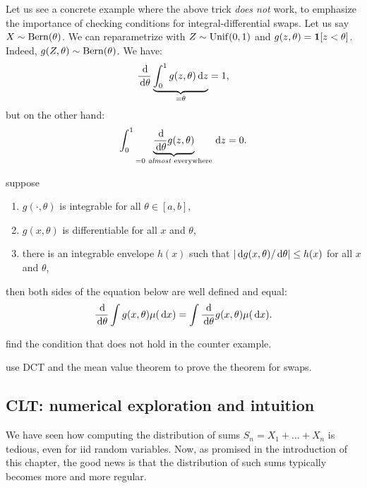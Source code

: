 \documentclass{article}
\begin{document}
 Let us see a concrete example where the above trick \emph{does not} work, to emphasize the importance of checking conditions for integral-differential swaps. Let us say $X \sim \operatorname{Bern}(\theta)$. We can reparametrize with $Z \sim \operatorname{Unif}(0,1)$ and $g(z, \theta) = {\mathbf 1}[z < \theta]$. Indeed, $g(Z, \theta) \sim \operatorname{Bern}(\theta)$. We have:
\[  \frac{\,\mathrm{d}}{\,\mathrm{d} \theta} \underbrace{ \int_0^1 g(z, \theta) \,\mathrm{d} z }_{=\theta} = 1,  \]
but on the other hand:
\[  \int_0^1 \underbrace{\frac{\,\mathrm{d}}{\,\mathrm{d} \theta} g(z, \theta)}_{=0 \text{ \emph{almost} everywhere}} \,\mathrm{d} z = 0. \]

 suppose 
\begin{enumerate}
  \item $g(\cdot, \theta)$ is integrable for all $\theta \in [a, b]$, 
  \item $g(x, \theta)$ is differentiable for all $x$ and $\theta$, 
  \item there is an integrable envelope $h(x)$ such that $|\,\mathrm{d} g(x, \theta) / \,\mathrm{d} \theta| \le h(x)$ for all $x$ and $\theta$,
\end{enumerate}
then both sides of the equation below are well defined and equal:
\[ \frac{\,\mathrm{d}}{\,\mathrm{d} \theta} \int g(x, \theta) \mu(\,\mathrm{d} x) = \int \frac{\,\mathrm{d}}{\,\mathrm{d} \theta} g(x, \theta)   \mu(\,\mathrm{d} x). \]

 find the condition that does not hold in the counter example.

 use DCT and the mean value theorem to prove the theorem for swaps.


\subsection{CLT: numerical exploration and intuition}\label{sec:clt-numerical}

We have seen how computing the distribution of sums $S_n = X_1 + \dots + X_n$ is tedious, even for iid random variables. Now, as promised in the introduction of this chapter, the good news is that the distribution of such sums typically becomes more and more regular.
\end{document}
